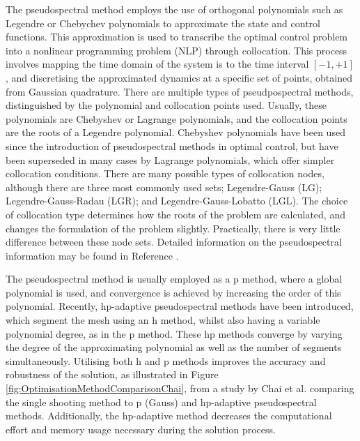 The pseudospectral method employs the use of orthogonal polynomials such as Legendre or Chebychev polynomials to approximate the state and control functions.
This approximation is used to transcribe the optimal control problem into a nonlinear programming problem (NLP) through collocation. This process involves mapping the time domain of the system is to the time interval $[-1,+1]$, and discretising the approximated dynamics at a specific set of points, obtained from Gaussian quadrature\cite{Fahroo2000,Huntington2007,Kelly2015,Rao2009,Garg2011}. 
There are multiple types of pseudpospectral methods, distinguished by the polynomial and collocation points used. Usually, these polynomials are Chebyshev or Lagrange polynomials\cite{Fahroo2000,Rao2009}, and the collocation points are the roots of a Legendre polynomial\cite{Garg2009}. Chebyshev polynomials have been used since the introduction of pseudospectral methods in optimal control, but have been superseded in many cases by Lagrange polynomials, which offer simpler collocation conditions\cite{Rao2009}. 
There are many possible types of collocation nodes, although there are three most commonly used sets; Legendre-Gauss (LG); Legendre-Gauss-Radau (LGR); and Legendre-Gauss-Lobatto (LGL)\cite{Garg2009,Rao2009}. The choice of collocation type determines how the roots of the problem are calculated, and changes the formulation of the problem slightly\cite{Garg2009}. Practically, there is very little difference between these node sets\cite{Garg2009}.
Detailed information on the pseudospectral information may be found in Reference \cite{Huntington2007}.


The pseudospectral method is usually employed as a \textsf{p} method, where a global polynomial is used, and convergence is achieved by increasing the order of this polynomial\cite{Rao2009}. Recently, \textsf{hp}-adaptive pseudospectral methods have been introduced, which segment the mesh using an h method, whilst also having a variable polynomial degree, as in the \textsf{p} method\cite{Darby2011a}. These \textsf{hp} methods converge by varying the degree of the approximating polynomial as well as the number of segments simultaneously. Utilising both \textsf{h} and \textsf{p} methods improves the accuracy and robustness of the solution, as illustrated in Figure \ref{fig:OptimisationMethodComparisonChai}, from a study by Chai et al.\cite{Chai2015} comparing the single shooting method to \textsf{p} (Gauss) and \textsf{hp}-adaptive pseudospectral methods. Additionally, the \textsf{hp}-adaptive method decreases the computational effort and memory usage necessary during the solution process\cite{Darby2011a,Chai2015}. 


